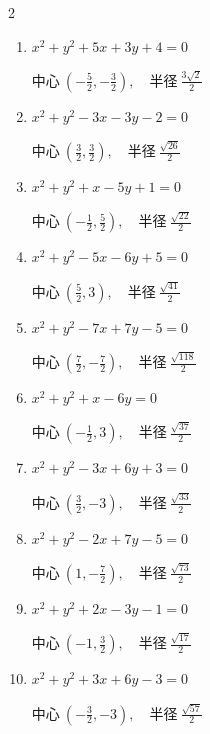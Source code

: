 \begin{multicols}{2}
\begin{enumerate}
  \item $x^{2}+y^{2}+5x+3y+4=0$

        $\displaystyle 中心\: \left(-\frac{5}{2},-\frac{3}{2}\right), \quad 半径 \ \frac{3\sqrt{2}}{2}$

  \item $x^{2}+y^{2}-3x-3y-2=0$

        $\displaystyle 中心\: \left(\frac{3}{2},\frac{3}{2}\right), \quad 半径 \ \frac{\sqrt{26}}{2}$

  \item $x^{2}+y^{2}+x-5y+1=0$

        $\displaystyle 中心\: \left(-\frac{1}{2},\frac{5}{2}\right), \quad 半径 \ \frac{\sqrt{22}}{2}$

  \item $x^{2}+y^{2}-5x-6y+5=0$

        $\displaystyle 中心\: \left(\frac{5}{2},3\right), \quad 半径 \ \frac{\sqrt{41}}{2}$

  \item $x^{2}+y^{2}-7x+7y-5=0$

        $\displaystyle 中心\: \left(\frac{7}{2},-\frac{7}{2}\right), \quad 半径 \ \frac{\sqrt{118}}{2}$

  \item $x^{2}+y^{2}+x-6y=0$

        $\displaystyle 中心\: \left(-\frac{1}{2},3\right), \quad 半径 \ \frac{\sqrt{37}}{2}$

  \item $x^{2}+y^{2}-3x+6y+3=0$

        $\displaystyle 中心\: \left(\frac{3}{2},-3\right), \quad 半径 \ \frac{\sqrt{33}}{2}$

  \item $x^{2}+y^{2}-2x+7y-5=0$

        $\displaystyle 中心\: \left(1,-\frac{7}{2}\right), \quad 半径 \ \frac{\sqrt{73}}{2}$

\columnbreak %

\resetques

  \item $x^{2}+y^{2}+2x-3y-1=0$

        $\displaystyle 中心\: \left(-1,\frac{3}{2}\right), \quad 半径 \ \frac{\sqrt{17}}{2}$

  \item $x^{2}+y^{2}+3x+6y-3=0$

        $\displaystyle 中心\: \left(-\frac{3}{2},-3\right), \quad 半径 \ \frac{\sqrt{57}}{2}$


\end{enumerate}
\end{multicols}
